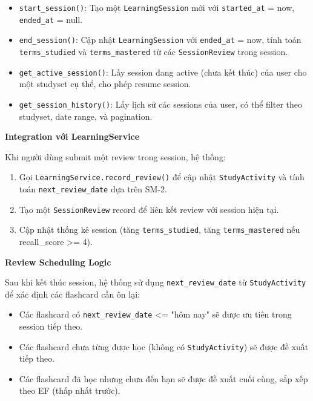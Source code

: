 \documentclass[../DoAn.tex]{subfiles}
\begin{document}
\begin{itemize}
    \item \texttt{start\_session()}: Tạo một \texttt{LearningSession} mới với \texttt{started\_at} = now, \texttt{ended\_at} = null.
    
    \item \texttt{end\_session()}: Cập nhật \texttt{LearningSession} với \texttt{ended\_at} = now, tính toán \texttt{terms\_studied} và \texttt{terms\_mastered} từ các \texttt{SessionReview} trong session.
    
    \item \texttt{get\_active\_session()}: Lấy session đang active (chưa kết thúc) của user cho một studyset cụ thể, cho phép resume session.
    
    \item \texttt{get\_session\_history()}: Lấy lịch sử các sessions của user, có thể filter theo studyset, date range, và pagination.
\end{itemize}

\textbf{Integration với LearningService}

Khi người dùng submit một review trong session, hệ thống:

\begin{enumerate}
    \item Gọi \texttt{LearningService.record\_review()} để cập nhật \texttt{StudyActivity} và tính toán \texttt{next\_review\_date} dựa trên SM-2.
    
    \item Tạo một \texttt{SessionReview} record để liên kết review với session hiện tại.
    
    \item Cập nhật thống kê session (tăng \texttt{terms\_studied}, tăng \texttt{terms\_mastered} nếu recall\_score >= 4).
\end{enumerate}

\textbf{Review Scheduling Logic}

Sau khi kết thúc session, hệ thống sử dụng \texttt{next\_review\_date} từ \texttt{StudyActivity} để xác định các flashcard cần ôn lại:

\begin{itemize}
    \item Các flashcard có \texttt{next\_review\_date} <= "hôm nay" sẽ được ưu tiên trong session tiếp theo.
    \item Các flashcard chưa từng được học (không có \texttt{StudyActivity}) sẽ được đề xuất tiếp theo.
    \item Các flashcard đã học nhưng chưa đến hạn sẽ được đề xuất cuối cùng, sắp xếp theo EF (thấp nhất trước).
\end{itemize}
\end{document}
